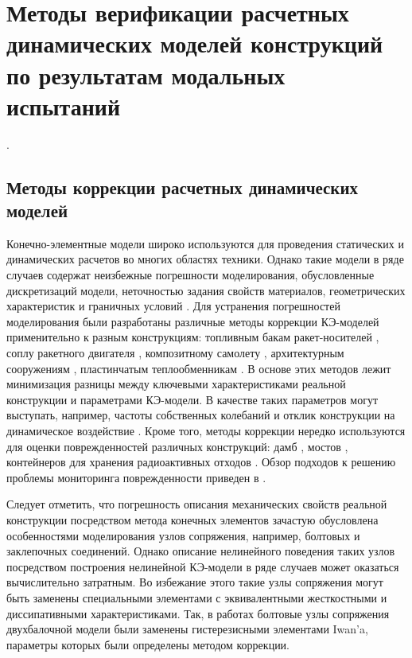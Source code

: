 \chapter{Методы верификации расчетных динамических моделей конструкций по результатам модальных испытаний}

.

\section{Методы коррекции расчетных динамических моделей} 

Конечно-элементные модели широко используются для проведения статических и динамических расчетов во многих областях техники. Однако такие модели в ряде случаев содержат неизбежные погрешности моделирования, обусловленные дискретизаций модели, неточностью задания свойств материалов, геометрических характеристик и граничных условий \cite{lib:modelUpdating:Bartilson}. Для устранения погрешностей моделирования были разработаны различные методы коррекции КЭ-моделей применительно к разным конструкциям: топливным бакам ракет-носителей \cite{lib:modelUpdating:Li&Tian}, соплу ракетного двигателя \cite{lib:modelUpdating:Yan&Li}, композитному самолету \cite{lib:modelUpdating:Zhao&Gupta}, архитектурным сооружениям \cite{lib:modelUpdating:Girardi&Padovani}, пластинчатым теплообменникам \cite{lib:modelUpdating:Guo&Wang}. В основе этих методов лежит минимизация разницы между ключевыми характеристиками реальной конструкции и параметрами КЭ-модели. В качестве таких параметров могут выступать, например, частоты собственных колебаний и отклик конструкции на динамическое воздействие \cite{lib:modelUpdating:Petersen&Oiseth}. Кроме того, методы коррекции нередко используются для оценки поврежденностей различных конструкций: дамб \cite{lib:modelUpdating:Bayraktar&Sevim}, мостов \cite{lib:modelUpdating:Cong&Thoi, lib:modelUpdating:Polanco}, контейнеров для хранения радиоактивных отходов \cite{lib:modelUpdating:Eiras}. Обзор подходов к решению проблемы мониторинга поврежденности приведен в \cite{lib:modelUpdating:Simoen}. 

Следует отметить, что погрешность описания механических свойств реальной конструкции посредством метода конечных элементов зачастую обусловлена особенностями моделирования узлов сопряжения, например, болтовых и заклепочных соединений. Однако описание нелинейного поведения таких узлов посредством построения нелинейной КЭ-модели в ряде случаев может оказаться вычислительно затратным. Во избежание этого такие узлы сопряжения могут быть заменены специальными элементами с эквивалентными жесткостными и диссипативными характеристиками. Так, в работах \cite{lib:modelUpdating:Lacayo, lib:modelUpdating:Yuan} болтовые узлы сопряжения двухбалочной модели были заменены гистерезисными элементами Iwan’a, параметры которых были определены методом коррекции. 

